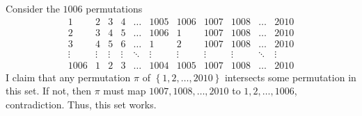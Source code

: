 Consider the $1006$ permutations
\[\begin{matrix}
	1 & 2 & 3 & 4 & \ldots & 1005 & 1006 & 1007 & 1008 & \ldots & 2010 \\
	2 & 3 & 4 & 5 & \ldots & 1006 & 1 & 1007 & 1008 & \ldots & 2010 \\
	3 & 4 & 5 & 6 & \ldots & 1 & 2 & 1007 & 1008 & \ldots & 2010 \\
	\vdots & \vdots & \vdots & \vdots & \ddots & \vdots & \vdots & \vdots & \vdots & \ddots & \vdots \\
	1006 & 1 & 2 & 3 & \ldots & 1004 & 1005 & 1007 & 1008 & \ldots & 2010
\end{matrix}\]
I claim that any permutation $\pi$ of $\left\{1,2,\ldots,2010\right\}$ intersects some permutation in this set. If not, then $\pi$ must map $1007,1008,\ldots,2010$ to $1,2,\ldots,1006$, contradiction. Thus, this set works.